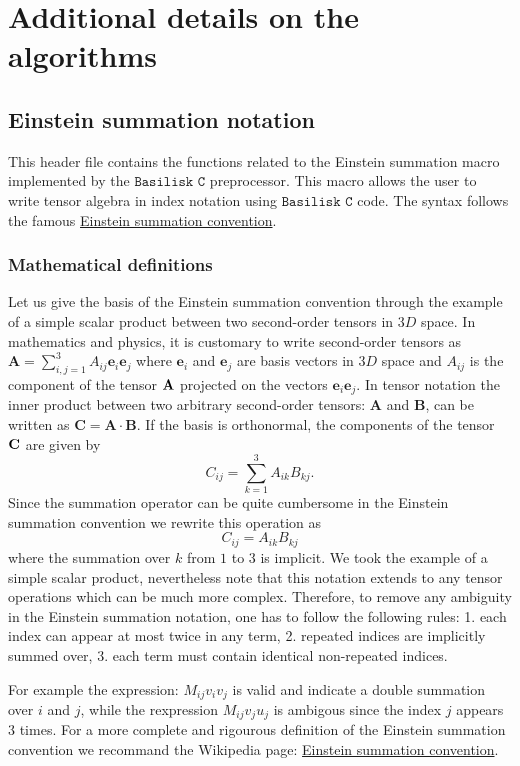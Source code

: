 \section{Additional details on the algorithms}
\subsection{ Einstein summation notation}

This header file contains the functions related to the Einstein summation macro implemented by the $\texttt{Basilisk C}$ preprocessor. This macro allows the user to write tensor algebra in index notation using $\texttt{Basilisk C}$ code. The syntax follows the famous \href{https://en.wikipedia.org/wiki/Einstein\_notation}{Einstein summation convention}.

\subsubsection{ Mathematical definitions}

Let us give the basis of the Einstein summation convention through the example of a simple scalar product between two second-order tensors in $3D$ space. In mathematics and physics, it is customary to write second-order tensors as $\textbf{A} = \sum_{i,j = 1}^3 A_{ij} \bm e_i\bm e_j$ where $\bm e_i$ and $\bm e_j$ are basis vectors in $3D$ space and $A_{ij}$ is the component of the tensor $\textbf A$ projected on the vectors $\bm e_i\bm e_j$. In tensor notation the inner product between two arbitrary second-order tensors: $\textbf{A}$ and $\textbf{B}$, can be written as $\textbf{C} =  \textbf{A}\cdot\textbf{B}$. If the basis is orthonormal, the components of the tensor $\textbf C$ are given by
$$ C_{ij} = \sum_{k=1}^3 A_{ik} B_{kj}.$$
Since the summation operator can be quite cumbersome in the Einstein summation convention we rewrite this operation as
$$ C_{ij} = A_{ik} B_{kj} $$
where the summation over $k$ from $1$ to $3$ is implicit.
We took the example of a simple scalar product, nevertheless note that this notation extends to any tensor operations which can be much more complex.   
Therefore, to remove any ambiguity in the Einstein summation notation, one has to follow the following rules:
1. each index can appear at most twice in any term,
2. repeated indices are implicitly summed over,
3. each term must contain identical non-repeated indices.

For example the expression: $M_{ij}v_iv_j$ is valid and indicate a double summation over $i$ and $j$, 
while the rexpression $M_{ij}v_ju_j$ is ambigous since the index $j$ appears $3$ times. 
For a more complete and rigourous definition of the Einstein summation convention we recommand the Wikipedia page: \href{https://en.wikipedia.org/wiki/Einstein\_notation}{Einstein summation convention}.

